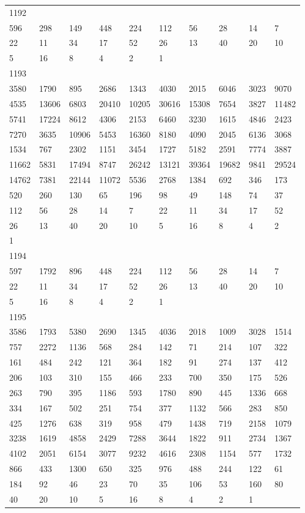 \begin{longtable}{*{10}{l}}
1192&&&&&&&&&\\
596& 298& 149& 448& 224& 112& 56& 28& 14& 7\\
22& 11& 34& 17& 52& 26& 13& 40& 20& 10\\
5& 16& 8& 4& 2& 1& \\

1193&&&&&&&&&\\
3580& 1790& 895& 2686& 1343& 4030& 2015& 6046& 3023& 9070\\
4535& 13606& 6803& 20410& 10205& 30616& 15308& 7654& 3827& 11482\\
5741& 17224& 8612& 4306& 2153& 6460& 3230& 1615& 4846& 2423\\
7270& 3635& 10906& 5453& 16360& 8180& 4090& 2045& 6136& 3068\\
1534& 767& 2302& 1151& 3454& 1727& 5182& 2591& 7774& 3887\\
11662& 5831& 17494& 8747& 26242& 13121& 39364& 19682& 9841& 29524\\
14762& 7381& 22144& 11072& 5536& 2768& 1384& 692& 346& 173\\
520& 260& 130& 65& 196& 98& 49& 148& 74& 37\\
112& 56& 28& 14& 7& 22& 11& 34& 17& 52\\
26& 13& 40& 20& 10& 5& 16& 8& 4& 2\\
1& \\

1194&&&&&&&&&\\
597& 1792& 896& 448& 224& 112& 56& 28& 14& 7\\
22& 11& 34& 17& 52& 26& 13& 40& 20& 10\\
5& 16& 8& 4& 2& 1& \\

1195&&&&&&&&&\\
3586& 1793& 5380& 2690& 1345& 4036& 2018& 1009& 3028& 1514\\
757& 2272& 1136& 568& 284& 142& 71& 214& 107& 322\\
161& 484& 242& 121& 364& 182& 91& 274& 137& 412\\
206& 103& 310& 155& 466& 233& 700& 350& 175& 526\\
263& 790& 395& 1186& 593& 1780& 890& 445& 1336& 668\\
334& 167& 502& 251& 754& 377& 1132& 566& 283& 850\\
425& 1276& 638& 319& 958& 479& 1438& 719& 2158& 1079\\
3238& 1619& 4858& 2429& 7288& 3644& 1822& 911& 2734& 1367\\
4102& 2051& 6154& 3077& 9232& 4616& 2308& 1154& 577& 1732\\
866& 433& 1300& 650& 325& 976& 488& 244& 122& 61\\
184& 92& 46& 23& 70& 35& 106& 53& 160& 80\\
40& 20& 10& 5& 16& 8& 4& 2& 1& \\


\end{longtable}
